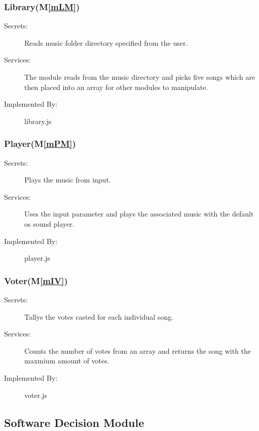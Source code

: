 \documentclass[12pt, titlepage]{article}
\newcommand{\mref}[1]{M\ref{#1}}
\begin{document}
\subsubsection{Library(\mref{mLM})} 
\begin{description} 
\item[Secrets:] Reads music folder directory specified from the user. \item[Services:]The module reads from the music directory and picks five songs which are then placed into an array for other modules to manipulate. \item[Implemented By:] library.js 
\end{description} 

\subsubsection{Player(\mref{mPM})}


\begin{description}
\item[Secrets:] Plays the music from input.
\item[Services:]Uses the input parameter and plays the associated music with the default os sound player.
\item[Implemented By:]player.js
\end{description}



\subsubsection{Voter(\mref{mIV})}


\begin{description}
\item[Secrets:]Tallys the votes casted for each individual song.
\item[Services:]Counts the number of votes from an array and returns the song with the maxmium amount of votes.
\item[Implemented By:] voter.js
\end{description}










\subsection{Software Decision Module}
\end{document}

